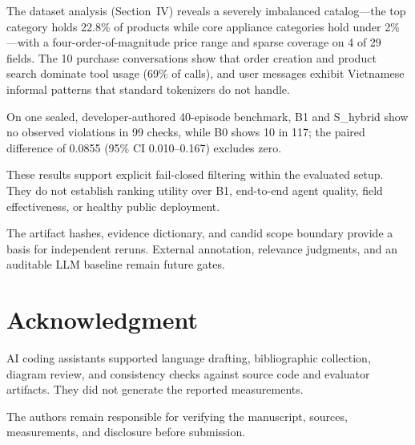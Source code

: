 \documentclass[conference,a4paper]{IEEEtran}
\begin{document}
The dataset analysis (Section~IV) reveals a severely imbalanced catalog---the top category holds 22.8\% of products while core appliance categories hold under 2\%---with a four-order-of-magnitude price range and sparse coverage on 4 of 29 fields. The 10 purchase conversations show that order creation and product search dominate tool usage (69\% of calls), and user messages exhibit Vietnamese informal patterns that standard tokenizers do not handle.

On one sealed, developer-authored 40-episode benchmark, B1 and S\_hybrid show no observed violations in 99 checks, while B0 shows 10 in 117; the paired difference of 0.0855 (95\% CI 0.010--0.167) excludes zero.

These results support explicit fail-closed filtering within the evaluated setup. They do not establish ranking utility over B1, end-to-end agent quality, field effectiveness, or healthy public deployment.

The artifact hashes, evidence dictionary, and candid scope boundary provide a basis for independent reruns. External annotation, relevance judgments, and an auditable LLM baseline remain future gates.

\section*{Acknowledgment}
AI coding assistants supported language drafting, bibliographic collection, diagram review, and consistency checks against source code and evaluator artifacts. They did not generate the reported measurements.

The authors remain responsible for verifying the manuscript, sources, measurements, and disclosure before submission.



\end{document}

